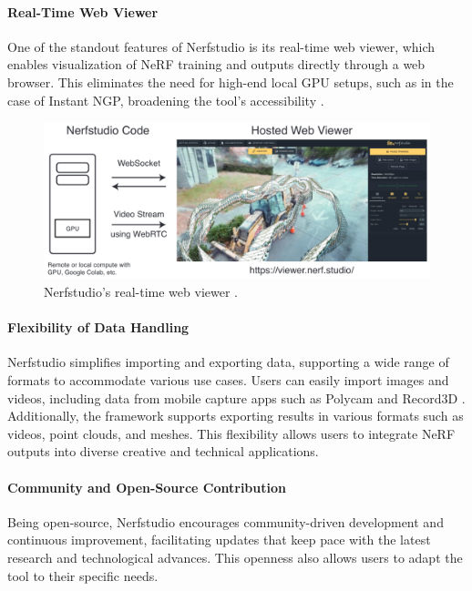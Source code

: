 \paragraph{Real-Time Web Viewer}
One of the standout features of Nerfstudio is its real-time web viewer, which enables visualization of NeRF training and outputs directly through a web browser.
This eliminates the need for high-end local GPU setups, such as in the case of Instant NGP, broadening the tool's accessibility \cite{noauthor_nerfstudio-projectviser_2024}.

\begin{figure}[h!]
  \centering
  \includegraphics[width=\textwidth]{figures/related-nerfstudio-viewer.png}
  \caption{Nerfstudio's real-time web viewer \cite{tancik_nerfstudio_2023}.}
  \label{fig:nerfstudio-viewer}
\end{figure}

\paragraph{Flexibility of Data Handling}
Nerfstudio simplifies importing and exporting data, supporting a wide range of formats to accommodate various use cases.
Users can easily import images and videos, including data from mobile capture apps such as Polycam \cite{noauthor_polycam_nodate} and Record3D \cite{noauthor_record3d_nodate}.
Additionally, the framework supports exporting results in various formats such as videos, point clouds, and meshes.
This flexibility allows users to integrate NeRF outputs into diverse creative and technical applications.

\paragraph{Community and Open-Source Contribution}
Being open-source, Nerfstudio encourages community-driven development and continuous improvement, facilitating updates that keep pace with the latest research and technological advances.
This openness also allows users to adapt the tool to their specific needs.

